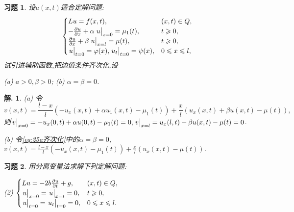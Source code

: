 \documentclass[a4paper,oneside,12pt]{ctexart}
\theoremstyle{plain}
\newtheorem{exercise}{习题}
\theoremstyle{nonumberplain}
\newtheorem{solution}{解.}
\theoremstyle{nonumberplain}
\renewcommand{\phi}{\varphi}
\begin{document}
    \begin{exercise}
        \label{ex:25}
        设$u(x,t)$适合定解问题: 
        \begin{equation*}
            \begin{cases}
                Lu=f(x,t), & (x,t)\in Q,\\
                -\pdv{u}{x}+\alpha\eval{u}_{x=0}=\mu_1(t), & t\geqslant 0,\\
                \pdv{u}{x}+\beta\eval{u}_{x=l}=\mu(t), & t\geqslant 0,\\
                \eval{u}_{t=0}=\phi(x),\eval{u_t}_{t=0}=\psi(x), & 0\leqslant x\leqslant l,
            \end{cases}
        \end{equation*}
        试引进辅助函数,把边值条件齐次化,设 
        
        (a) $a>0,\beta>0$; \quad (b) $\alpha=\beta=0$.
    \end{exercise}

    \begin{solution}
        (a) 令
        \begin{equation}
            \label{eq:25a齐次化}
            v(x,t)=\frac{l-x}{l}(-u_x(x,t)+\alpha u_1(x,t)-\mu_1(t))+\frac{x}{l}(u_x(x,t)+\beta u(x,t)-\mu(t)),
        \end{equation}
        则$\eval{v}_{x=0}=-u_x(0,t)+\alpha u(0,t)-\mu_1(t)=0,\eval{v}_{x=l}=u_x(l,t)+\beta u(x,t)-\mu(t)=0$.

        (b) 令\cref{eq:25a齐次化}中的$\alpha=\beta=0$,$v(x,t)=\frac{l-x}{l}(-u_x(x,t)-\mu_1(t))+\frac{x}{l}(u_x(x,t)-\mu(t))$.
    \end{solution}

    \begin{exercise}
        \label{ex:26.(2)}
        用分离变量法求解下列定解问题: 
        
        (2) $\begin{cases}
            Lu=-2b\pdv{u}{t}+g, & (x,t)\in Q,\\
            \eval{u}_{x=0}=\eval{u}_{x=t}=0, & t\geqslant 0,\\
            \eval{u}_{t=0}=\eval{u_t}_{t=0}=0, & 0\leqslant x\leqslant l.
        \end{cases}$
    \end{exercise}
\end{document}
